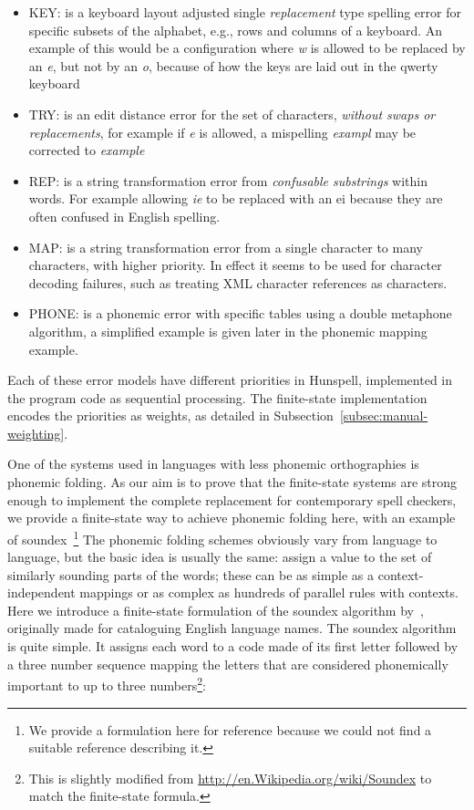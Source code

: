 \documentclass[a4paper,12pt]{article}
\begin{document}
\begin{itemize}
    \item KEY: is a keyboard layout adjusted single \emph{replacement} type
        spelling error for specific subsets of the alphabet, e.g., rows and
        columns of a keyboard. An example of this would be a configuration
        where \emph{w} is allowed to be replaced by an \emph{e}, but not
        by an \emph{o}, because of how the keys are laid out in the qwerty
        keyboard
    \item TRY: is an edit distance error for the set of characters,
        \emph{without swaps or replacements}, for example if \emph{e} is
        allowed, a mispelling \emph{exampl} may be corrected to \emph{example}
    \item REP: is a string transformation error from \emph{confusable
        substrings} within words. For example allowing \emph{ie} to be replaced
        with an {ei} because they are often confused in English spelling.
    \item MAP: is a string transformation error from a single character to
        many characters, with higher priority. In effect it seems to be
        used for character decoding failures, such as treating XML character
        references as characters.
    \item PHONE: is a phonemic error with specific tables using a double
        metaphone algorithm, a simplified example is given later in the
        phonemic mapping example.
\end{itemize}

Each of these error models have different priorities in Hunspell, implemented
in the program code as sequential processing. The finite-state implementation
encodes the priorities as weights, as detailed in
Subsection~\ref{subsec:manual-weighting}.

One of the systems used in languages with less phonemic
orthographies is phonemic folding. As our aim is to prove that the
finite-state systems are strong enough to implement the complete
replacement for contemporary spell checkers, we provide a finite-state way
to achieve phonemic folding here, with an example of soundex~\footnote{We
provide a formulation here for reference because we could not find a suitable
reference describing it.} The phonemic folding
schemes obviously vary from language to language, but the basic idea is
usually the same: assign a value to the set of similarly sounding parts of
the words; these can be as simple as a context-independent mappings or as
complex as hundreds of parallel rules with contexts. Here we introduce a
finite-state formulation of the soundex algorithm by~\cite{russell1918soundex},
originally made for cataloguing English language names. The soundex algorithm
is quite simple. It assigns each word to a code made of its first letter
followed by a three number sequence mapping the letters that are considered
phonemically important to up to three numbers\footnote{This is slightly
modified from \url{http://en.Wikipedia.org/wiki/Soundex} to match the
finite-state formula.}:
\end{document}
